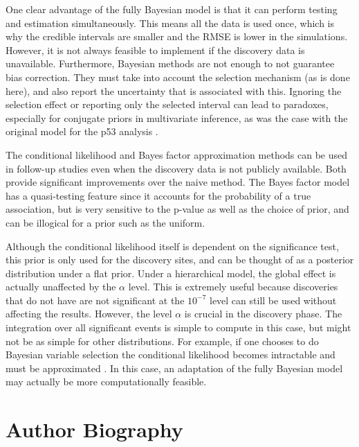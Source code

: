 \documentclass[AMA,STIX1COL]{WileyNJD-v2}\usepackage[]{graphicx}\usepackage[]{color}
\begin{document}
One clear advantage of the fully Bayesian model is that it can perform testing and estimation simultaneously. This means all the data is used once, which is why the credible intervals are smaller and the RMSE is lower in the simulations. However, it is not always feasible to implement if the discovery data is unavailable. Furthermore, Bayesian methods are not enough to not guarantee bias correction. They must take into account the selection mechanism (as is done here), and also report the uncertainty that is associated with this. Ignoring the selection effect or reporting only the selected interval can lead to paradoxes, especially for conjugate priors in multivariate inference, as was the case with the original model for the p53 analysis \cite{dawid1994selection}.

The conditional likelihood and Bayes factor approximation methods can be used in follow-up studies even when the discovery data is not publicly available. Both provide significant improvements over the naive method. The Bayes factor model has a quasi-testing feature since it accounts for the probability of a true association, but is very sensitive to the p-value as well as the choice of prior, and can be illogical for a prior such as the uniform.

Although the conditional likelihood itself is dependent on the significance test, this prior is only used for the discovery sites, and can be thought of as a posterior distribution under a flat prior. Under a hierarchical model, the global effect is actually unaffected by the $\alpha$ level. This is extremely useful because discoveries that do not have are not significant at the $10^{-7}$ level can still be used without affecting the results. However, the level $\alpha$ is crucial in the discovery phase. The integration over all significant events is simple to compute in this case, but might not be as simple for other distributions. For example, if one chooses to do Bayesian variable selection the conditional likelihood becomes intractable and must be approximated \cite{panigrahi2016bayesian}. In this case, an adaptation of the fully Bayesian model may actually be more computationally feasible.



\nocite{*}%


\clearpage

\section*{Author Biography}
\end{document}

